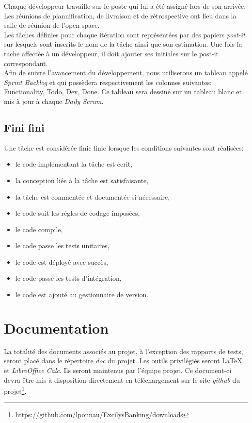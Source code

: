 \documentclass[11pt]{article}
\begin{document}
Chaque développeur travaille sur le poste qui lui a été assigné lors de son
arrivée. Les réunions de plannification, de livraison et de rétrospective
ont lieu dans la salle de réunion de l'open space.\\

Les tâches définies pour chaque itération sont représentées par des papiers
\emph{post-it} sur lesquels sont inscrits le nom de la tâche ainsi que son
estimation. Une fois la tache affectée à un développeur, 
il doit ajouter ses initiales sur le post-it correspondant.\\

Afin de suivre l'avancement du développement, nous utiliserons un tableau appelé \emph{Sprint Backlog} et qui possèdera respectivement les colonnes suivantes: Functionality, Todo, Dev, Done. Ce tableau sera dessiné sur un tableau blanc et mis à jour à chaque \emph{Daily Scrum}.

\subsection{Fini fini}

Une tâche est considérée finie finie lorsque les conditions suivantes sont
réalisées:

\begin{itemize}
\item le code implémentant la tâche est écrit,
\item la conception liée à la tâche est satisfaisante,
\item la tâche est commentée et documentée si nécessaire,
\item le code suit les règles de codage imposées,
\item le code compile,
\item le code passe les tests unitaires,
\item le code est déployé avec succès,
\item le code passe les tests d'intégration,
\item le code est ajouté au gestionnaire de version.
\end{itemize}

\section{Documentation}

La totalité des documents associés au projet, à l'exception des rapports de tests, seront placé dans le répertoire \emph{doc} du projet. Les outils privilégiés seront \LaTeX{} et \emph{LibreOffice Calc}. Ils seront maintenus par l'équipe projet. Ce document-ci devra être mis à disposition directement en téléchargement sur le site \emph{github} du projet\footnote{https://github.com/lponnau/ExcilysBanking/downloads}.
\end{document}
